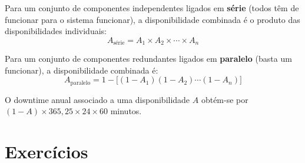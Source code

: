 \documentclass[11pt,a4paper]{article}
\begin{document}
Para um conjunto de componentes independentes ligados em \textbf{série} (todos têm de funcionar para o sistema funcionar), a disponibilidade combinada é o produto das disponibilidades individuais:
\[
A_{\text{série}} = A_1 \times A_2 \times \cdots \times A_n
\]

Para um conjunto de componentes redundantes ligados em \textbf{paralelo} (basta um funcionar), a disponibilidade combinada é:
\[
A_{\text{paralelo}} = 1 - \big[(1-A_1)(1-A_2)\cdots(1-A_n)\big]
\]

O downtime anual associado a uma disponibilidade $A$ obtém-se por $(1-A) \times 365{,}25 \times 24 \times 60$ minutos.

\section{Exercícios}
\end{document}
